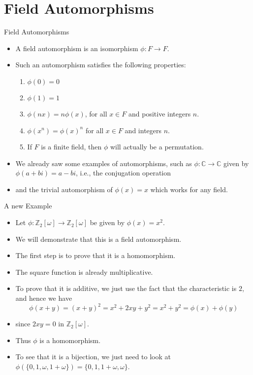 \documentclass[ %
 10pt, xcolor={dvipsnames,svgnames,x11names,hyperref},
   hyperref={colorlinks=true,citecolor=green,linkcolor=DarkRed,urlcolor=ProcessBlue,anchorcolor=blue}
  ]{beamer}
\newenvironment{stepitemize}{\begin{itemize}[<+->]}{\end{itemize} }
\newcommand{\Z}{\mathbb{Z}}
\newcommand{\C}{\mathbb{C}}
\begin{document}
\section{Field Automorphisms}
\begin{frame}{Field Automorphisms}
\begin{stepitemize}
\item A field automorphism is an isomorphism $\phi:F\rightarrow F$. 
\item Such an automorphism satisfies the following properties:
\begin{enumerate}
    \item $\phi(0)=0$
    \item $\phi(1)=1$
    \item $\phi(nx)=n\phi(x)$, for all $x\in F$ and positive integers $n$.
    \item $\phi(x^n)=\phi(x)^n$ for all $x\in F$ and integers $n$. 
    \item If $F$ is a finite field, then $\phi$ will actually be a permutation. 

\end{enumerate}
\item We already saw some examples of automorphisms, such as $\phi:\C\rightarrow \C$ given by $\phi(a+bi)=a-bi$, i.e., the conjugation operation
\item and the trivial automorphism of $\phi(x)=x$ which works for any field.
\end{stepitemize}
\end{frame}

\begin{frame}{A new Example}
\begin{stepitemize}
    \item Let $\phi:\Z_2[\omega]\rightarrow \Z_2[\omega]$ be given by $\phi(x)=x^2$. 
    \item We will demonstrate that this is a field automorphism. 

\item The first step is to prove that it is a homomorphism. \item The square function is already multiplicative. 
\item To prove that it is additive, we just use the fact that the characteristic is $2$, and hence we have
$$\phi(x+y) = (x+y)^2=x^2+2xy+y^2=x^2+y^2 = \phi(x)+\phi(y)$$
\item since $2xy=0$ in $\Z_2[\omega]$. 
\item Thus $\phi$ is a homomorphism. 
\item To see that it is a bijection, we just need to look at $\phi(\{0,1,\omega, 1+\omega\}) = \{0,1, 1+\omega, \omega\}$. 

\end{stepitemize}
\end{frame}
\end{document}
